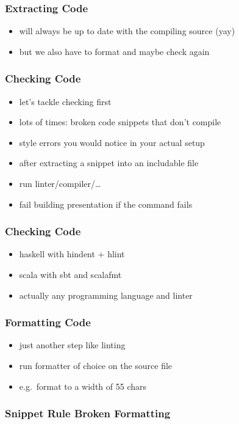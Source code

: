 \documentclass{beamer}
\begin{document}
\begin{frame}
  \frametitle{Extracting Code}
  \begin{itemize}
  \item will always be up to date with the compiling source (yay)
  \item but we also have to format and maybe check again
  \end{itemize}
\end{frame}

\begin{frame}
  \frametitle{Checking Code}
  \begin{itemize}
  \item let's tackle checking first
  \item lots of times: broken code snippets that don't compile
  \item style errors you would notice in your actual setup
  \item after extracting a snippet into an includable file
  \item run linter/compiler/\ldots
  \item fail building presentation if the command fails
  \end{itemize}
\end{frame}

\begin{frame}
  \frametitle{Checking Code}
  \begin{itemize}
  \item haskell with hindent + hlint
  \item scala with sbt and scalafmt
  \item actually any programming language and linter
  \end{itemize}
\end{frame}

\begin{frame}
  \frametitle{Formatting Code}
  \begin{itemize}
  \item just another step like linting
  \item run formatter of choice on the source file
  \item e.g.\ format to a width of 55 chars
  \end{itemize}
\end{frame}

\begin{frame}
  \frametitle{Snippet Rule \textemdash{} Broken Formatting}
  \begin{center}
    \inputminted[autogobble, highlightlines={3}]{haskell}{snippets/outer-haskell-snippet-rule.hs_noformat}
  \end{center}
\end{frame}
\end{document}
